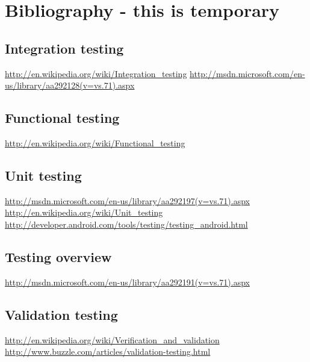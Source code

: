 \section{Bibliography - this is temporary}
	
	\subsection{Integration testing}
	\url{http://en.wikipedia.org/wiki/Integration_testing}
	\url{http://msdn.microsoft.com/en-us/library/aa292128(v=vs.71).aspx}

	\subsection{Functional testing}
	\url{http://en.wikipedia.org/wiki/Functional_testing}

	\subsection{Unit testing}
	\url{http://msdn.microsoft.com/en-us/library/aa292197(v=vs.71).aspx}
	\url{http://en.wikipedia.org/wiki/Unit_testing}
	\url{http://developer.android.com/tools/testing/testing_android.html}

	\subsection{Testing overview}
	\url{http://msdn.microsoft.com/en-us/library/aa292191(v=vs.71).aspx}

	\subsection{Validation testing}
	\url{http://en.wikipedia.org/wiki/Verification_and_validation}
	\url{http://www.buzzle.com/articles/validation-testing.html}
